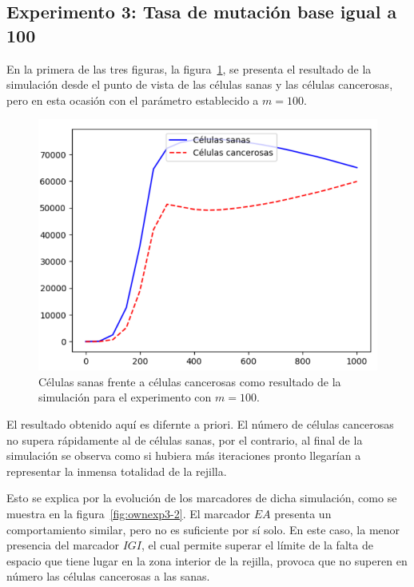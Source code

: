 \subsection{Experimento 3: Tasa de mutación base igual a 100}

En la primera de las tres figuras, la figura~\ref{fig:ownexp3-1}, se presenta el resultado
de la simulación desde el punto de vista de las células sanas y las células cancerosas,
pero en esta ocasión con el parámetro establecido a $m=100$.

\begin{figure}[h]
\centering
\includegraphics[scale=0.8]{figures/experiments/exp3/healthvscarcino}
\caption{Células sanas frente a células cancerosas como resultado de la simulación para el experimento con $m = 100$.}
\label{fig:ownexp3-1}
\end{figure}

El resultado obtenido aquí es difernte a priori. El número de células cancerosas
no supera rápidamente al de células sanas, por el contrario, al final de la simulación
se observa como si hubiera más iteraciones pronto llegarían a representar la inmensa
totalidad de la rejilla.

Esto se explica por la evolución de los marcadores de dicha simulación, como se muestra en
la figura~\ref{fig:ownexp3-2}. El marcador $EA$ presenta un comportamiento similar, pero
no es suficiente por sí solo. En este caso, la menor presencia del marcador $IGI$, el cual
permite superar el límite de la falta de espacio que tiene lugar en la zona interior de la rejilla,
provoca que no superen en número las células cancerosas a las sanas.

